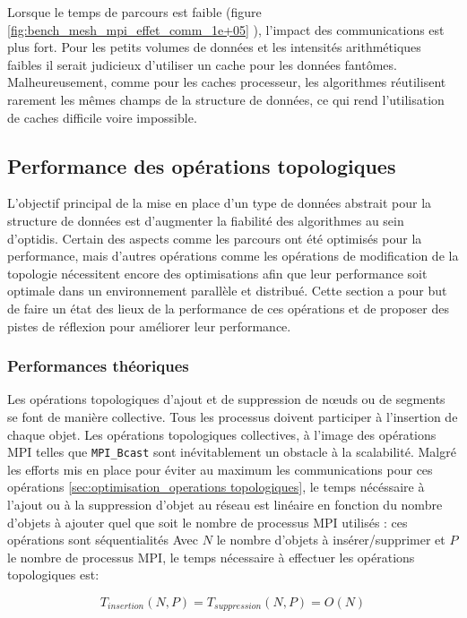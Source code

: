 Lorsque le temps de parcours est faible (figure \ref{fig:bench_mesh_mpi_effet_comm_1e+05} ), l'impact des communications est plus fort. Pour les petits volumes de données et les intensités arithmétiques faibles il serait judicieux d'utiliser un cache pour les données fantômes. Malheureusement, comme pour les caches processeur, les algorithmes réutilisent rarement les mêmes champs de la structure de données, ce qui rend l'utilisation de caches difficile voire impossible.


\subsection{Performance des opérations topologiques}

L'objectif principal de la mise en place d'un type de données abstrait pour la structure de données est d'augmenter la fiabilité des algorithmes au sein d'optidis. Certain des aspects comme les parcours ont été optimisés pour la performance, mais d'autres opérations comme les opérations de modification de la topologie nécessitent encore des optimisations afin que leur performance soit optimale dans un environnement parallèle et distribué. Cette section a pour but de faire un état des lieux de la performance de ces opérations et de proposer des pistes de réflexion pour améliorer leur performance.

\subsubsection{Performances théoriques}

Les opérations topologiques d'ajout et de suppression de nœuds ou de segments se font de manière collective. Tous les processus doivent participer à l'insertion de chaque objet. Les opérations topologiques collectives, à l'image des opérations MPI telles que \verb|MPI_Bcast| sont inévitablement un obstacle à la scalabilité. Malgré les efforts mis en place pour éviter au maximum les communications pour ces opérations \ref{sec:optimisation_operations topologiques}, le temps nécéssaire à l'ajout ou à la suppression d'objet au réseau est linéaire en fonction du nombre d'objets à ajouter quel que soit le nombre de processus MPI utilisés : ces opérations sont séquentialités Avec $N$ le nombre d'objets à insérer/supprimer et $P$ le nombre de processus MPI, le temps nécessaire à effectuer les opérations topologiques est:

\begin{equation}
	T_{insertion}(N,P) = T_{suppression}(N,P) = O(N)
\end{equation}

